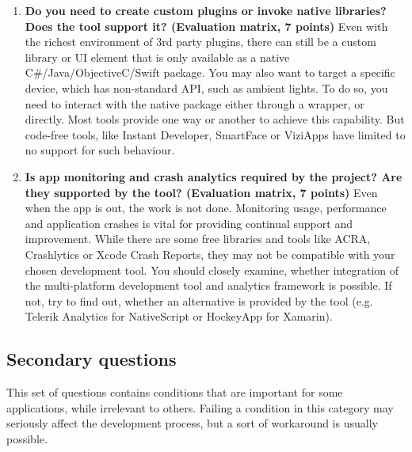 \documentclass[english,master,public,dept460,male,cpdeclaration,oneside]{diploma}
\begin{document}
\begin{enumerate}
	\item \textbf{Do you need to create custom plugins or invoke native libraries? Does the tool support it? (Evaluation matrix, 7 points) }
	Even with the richest environment of 3rd party plugins, there can still be a custom library or UI element that is only available as a native C\#/Java/ObjectiveC/Swift package. You may also want to target a specific device, which has non-standard API, such as ambient lights. To do so, you need to interact with the native package either through a wrapper, or directly. Most tools provide one way or another to achieve this capability. But code-free tools, like Instant Developer, SmartFace or ViziApps have limited to no support for such behaviour.
	
	\item \textbf{Is app monitoring and crash analytics required by the project? Are they supported by the tool? (Evaluation matrix, 7 points) }
	Even when the app is out, the work is not done. Monitoring usage, performance and application crashes is vital for providing continual support and improvement. While there are some free libraries and tools like ACRA, Crashlytics or Xcode Crash Reports, they may not be compatible with your chosen development tool. You should closely examine, whether integration of the multi-platform development tool and analytics framework is possible. If not, try to find out, whether an alternative is provided by the tool (e.g. Telerik Analytics for NativeScript or HockeyApp for Xamarin).
\end{enumerate}

\subsection{Secondary questions}
This set of questions contains conditions that are important for some applications, while irrelevant to others. Failing a condition in this category may seriously affect the development process, but a sort of workaround is usually possible.
\end{document}

